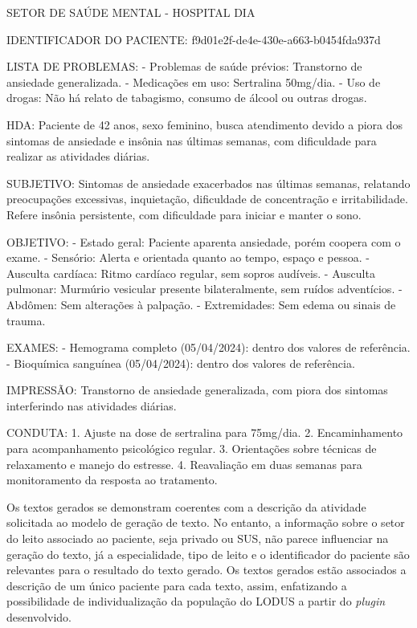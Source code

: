 \begin{spverbatim}
SETOR DE SAÚDE MENTAL - HOSPITAL DIA

IDENTIFICADOR DO PACIENTE: f9d01e2f-de4e-430e-a663-b0454fda937d

LISTA DE PROBLEMAS:
- Problemas de saúde prévios: Transtorno de ansiedade generalizada.
- Medicações em uso: Sertralina 50mg/dia.
- Uso de drogas: Não há relato de tabagismo, consumo de álcool ou outras 
drogas.

HDA:
Paciente de 42 anos, sexo feminino, busca atendimento devido a piora dos 
sintomas de ansiedade e insônia nas últimas semanas, com dificuldade para 
realizar as atividades diárias.

SUBJETIVO:
Sintomas de ansiedade exacerbados nas últimas semanas, relatando preocupações 
excessivas, inquietação, dificuldade de concentração e irritabilidade. Refere 
insônia persistente, com dificuldade para iniciar e manter o sono.

OBJETIVO:
- Estado geral: Paciente aparenta ansiedade, porém coopera com o exame.
- Sensório: Alerta e orientada quanto ao tempo, espaço e pessoa.
- Ausculta cardíaca: Ritmo cardíaco regular, sem sopros audíveis.
- Ausculta pulmonar: Murmúrio vesicular presente bilateralmente, sem ruídos 
adventícios.
- Abdômen: Sem alterações à palpação.
- Extremidades: Sem edema ou sinais de trauma.

EXAMES:
- Hemograma completo (05/04/2024): dentro dos valores de referência.
- Bioquímica sanguínea (05/04/2024): dentro dos valores de referência.

IMPRESSÃO:
Transtorno de ansiedade generalizada, com piora dos sintomas interferindo 
nas atividades diárias.

CONDUTA:
1. Ajuste na dose de sertralina para 75mg/dia.
2. Encaminhamento para acompanhamento psicológico regular.
3. Orientações sobre técnicas de relaxamento e manejo do estresse.
4. Reavaliação em duas semanas para monitoramento da resposta ao tratamento.
\end{spverbatim}

Os textos gerados se demonstram coerentes com a descrição da atividade solicitada ao modelo de geração de texto. No entanto, a informação sobre o setor do leito associado ao paciente, seja privado ou SUS, não parece influenciar na geração do texto, já a especialidade, tipo de leito e o identificador do paciente são relevantes para o resultado do texto gerado. Os textos gerados estão associados a descrição de um único paciente para cada texto, assim, enfatizando a possibilidade de individualização da população do LODUS a partir do \textit{plugin} desenvolvido.